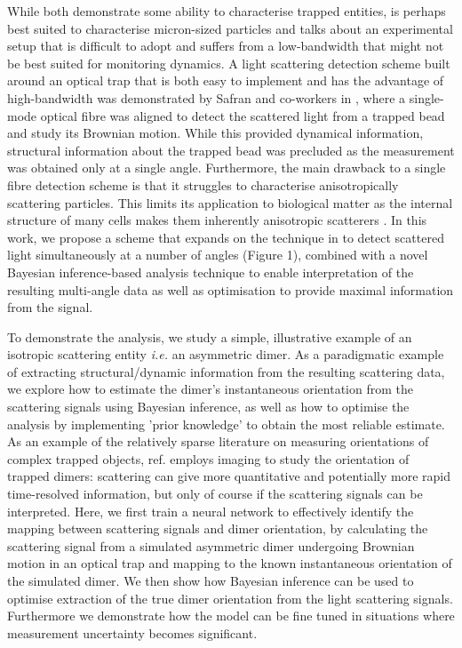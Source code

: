 \documentclass[final,  3p]{elsarticle}
\begin{document}
While both \cite{Carvalho_2023} \cite{Watson_2023} demonstrate some ability to characterise trapped entities, \cite{Carvalho_2023} is perhaps best suited to characterise micron-sized particles and \cite{Watson_2023} talks about an experimental setup that is difficult to adopt and suffers from a low-bandwidth that might not be best suited for monitoring dynamics. A light scattering detection scheme built around an optical trap that is both easy to implement and has the advantage of high-bandwidth was demonstrated by Safran and co-workers in \cite{Bar-Ziv_1998}, where a single-mode optical fibre was aligned to detect the scattered light from a trapped bead and study its Brownian motion. While this provided dynamical information, structural information about the trapped bead was precluded as the measurement was obtained only at a single angle. Furthermore, the main drawback to a single fibre detection scheme is that it struggles to characterise anisotropically scattering particles. This limits its application to biological matter as the internal structure of many cells makes them inherently anisotropic scatterers \cite{Watson_2023}. In this work, we propose a scheme that expands on the technique in \cite{Bar-Ziv_1998} to detect scattered light simultaneously at a number of angles (Figure 1), combined with a novel Bayesian inference-based analysis technique to enable interpretation of the resulting multi-angle data as well as optimisation to provide maximal information from the signal. 

To demonstrate the analysis, we study a simple, illustrative example of an isotropic scattering entity \emph{i.e.} an asymmetric dimer. As a paradigmatic example of extracting structural/dynamic information from the resulting scattering data, we explore how to estimate the dimer's instantaneous orientation from the scattering signals using Bayesian inference, as well as how to optimise the analysis by implementing 'prior knowledge' to obtain the most reliable estimate. As an example of the relatively sparse literature on measuring orientations of complex trapped objects, ref. employs imaging to study the orientation of trapped dimers: scattering can give more quantitative and potentially more rapid time-resolved information, but only of course if the scattering signals can be interpreted. Here, we first train a neural network to effectively identify the mapping between scattering signals and dimer orientation, by calculating the scattering signal from a simulated asymmetric dimer undergoing Brownian motion in an optical trap and mapping to the known instantaneous orientation of the simulated dimer. We then show how Bayesian inference can be used to optimise extraction of the true dimer orientation from the light scattering signals. Furthermore we demonstrate how the model can be fine tuned in situations where measurement uncertainty becomes significant. 
\end{document}
